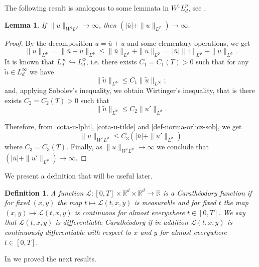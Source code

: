 \documentclass[twoside]{article}
\newtheorem{lem}[thm]{Lemma}
\newtheorem{defi}[thm]{Definition}
\theoremstyle{remark}
\newcommand{\orlnor}{\|_{L^{\Phi}}}
\newcommand{\lphi}{L^{\Phi}}
\newcommand{\sobnor}{\|_{W^{1}\lphi}}
\renewcommand{\leq}{\leqslant}
\begin{document}
The following result is analogous to some lemmata in $W^1L^p_d$, see \cite{xu2007some}.
\begin{lem}\label{infinito-a-prom-upunto}
If $\|u\sobnor\to \infty$, then $(|\overline{u}|+\|\dot{u}\orlnor)\to \infty$.
\end{lem}

\begin{proof}
By the decomposition $u=\overline{u}+\tilde{u}$ and some elementary operations,
we get
\begin{equation}\label{cota-u-lphi}
\|u\orlnor=
\|\overline{u}+\tilde{u}\orlnor\leq
\|\overline{u}\orlnor+\|\tilde{u}\orlnor=
|\overline{u}|\|1\orlnor+\|\tilde{u}\orlnor.
\end{equation}
It is known that $L^{\infty}_d\hookrightarrow\lphi_d$, i.e.
there exists $C_1=C_1(T)>0$ such that for any $\tilde{u}\in L^{\infty}_d$ we have
\[
\|\tilde{u}\orlnor
\leq 
C_1 \|\tilde{u}\|_{L^{\infty}};
\]
and, applying  Sobolev's inequality,  we obtain Wirtinger's inequality, that is there exists $C_2=C_2(T)>0$ such that 
\begin{equation}\label{cota-u-tilde}
\|\tilde{u}\orlnor
\leq 
C_2\|u'\orlnor.
\end{equation}

Therefore, from \eqref{cota-u-lphi}, \eqref{cota-u-tilde} and \eqref{def-norma-orlicz-sob}, 
we get
\[
\|u\sobnor\leq
C_3(|\overline{u}|+\|u'\orlnor)
\]
where $C_3=C_3(T)$. Finally, as $\|u\sobnor\to \infty$ we conclude that
$(|\overline{u}|+\|u'\orlnor)\to \infty$.
\end{proof}


We present a definition that will be useful later.
 
\begin{defi} A function $\mathcal{L}:[0,T]\times \mathbb{R}^d \times \mathbb{R}^d \rightarrow \mathbb{R}$ is a \emph{Carath\'eodory} function if for fixed $(x,y)$
the map $t \mapsto \mathcal{L}(t, x,y)$ is measurable  and for fixed $t$ the map  $(x,y) \mapsto \mathcal{L}(t, x, y)$ is continuous  for almost everywhere $t\in [0,T]$. We say that
$\mathcal{L}(t, x,y)$ is  \emph{differentiable Carath\'eodory} if in addition $\mathcal{L}(t, x,y)$ is
continuously differentiable with respect to $x$ and $y$  for almost everywhere $t\in [0,T]$.

\end{defi}


In \cite{ABGMS2015} we proved the next results.
\end{document}
